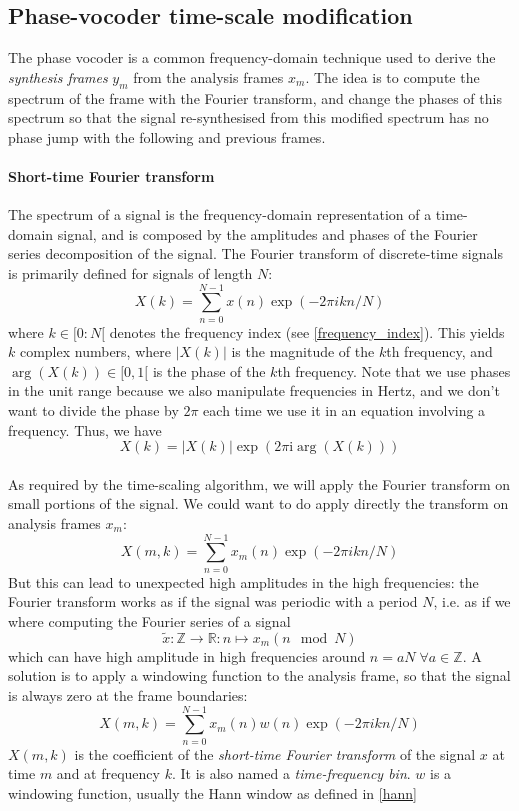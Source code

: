 \documentclass[letterpaper]{article}
\begin{document}
\subsection{Phase-vocoder time-scale modification}
The phase vocoder is a common frequency-domain technique used to derive the
\emph{synthesis frames} \(y_m\)  from the analysis frames \(x_m\). The idea
is to compute the spectrum of the frame with the Fourier transform, and change
the phases of this spectrum so that the signal re-synthesised from this modified
spectrum has no phase jump with the following and previous frames.
\paragraph{Short-time Fourier transform}
The spectrum of a signal is the frequency-domain representation of
a time-domain signal, and is composed by the amplitudes and phases of the
Fourier series decomposition of the signal. The Fourier transform of
discrete-time signals is primarily defined for signals of length \(N\):
\begin{equation}
	  X(k) = \sum_{n=0}^{N-1}x(n)\exp(-2\pi ikn/N)
\end{equation}
where \(k\in [0:N[\) denotes the frequency index (see \eqref{frequency_index}). This yields \(k\) complex
numbers, where \(|X(k)|\) is the magnitude of the \(k\)th frequency, and
\(\arg(X(k))\in[0,1[\) is the phase of the \(k\)th frequency. Note that we use
phases in the unit range because we also manipulate frequencies in Hertz, and
we don't want to divide the phase by \(2\pi\) each time we use it in an equation
involving a frequency. Thus, we have
\begin{equation}
		X(k)= |X(k)|\exp(2\pi \text{i} \arg(X(k)))
\end{equation}
\paragraph{}
As required by the time-scaling algorithm, we will apply the Fourier transform
on small portions of the signal. We could want to do apply directly the
transform on analysis frames \(x_m\):
\begin{equation*}
X(m,k)=\sum_{n=0}^{N-1}x_m(n)\exp(-2\pi ikn/N)
\end{equation*}
But this can lead to unexpected high amplitudes in the high frequencies:
the Fourier transform works as if the signal was periodic with a period \(N\),
i.e. as if we where computing the Fourier series of a signal
\begin{equation}
\tilde x:\mathbb{Z}\to\mathbb{R}:n\mapsto x_m(n\mod N)
\end{equation}
which can have high amplitude in high frequencies around
\(n=aN\;\forall a\in\mathbb{Z}\).
A solution is to apply a windowing function to the analysis frame, so that the
signal is always zero at the frame boundaries:
\begin{equation}
    X(m,k) = \sum_{n=0}^{N-1}x_m(n)w(n)\exp(-2\pi ikn/N)
\end{equation}
\(X(m,k)\) is the coefficient of the \emph{short-time Fourier transform} of
the signal \(x\) at time \(m\) and at frequency \(k\). It is also named a
\emph{time-frequency bin}. \(w\) is a windowing function, usually the Hann
window as defined in \eqref{hann}
\end{document}
